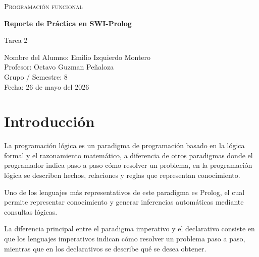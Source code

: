 \documentclass[12pt,a4paper]{article}
\begin{document}
\begin{titlepage}
    \centering


    {\scshape\Large Programación funcional \par}
    \vspace{1.5cm}

    {\huge\bfseries Reporte de Práctica en SWI-Prolog \par}
    \vspace{0.5cm}
    {\Large Tarea 2 \par}

    \vfill

    {\large
    Nombre del Alumno: Emilio Izquierdo Montero {\hspace{6cm}} \\
    \vspace{0.3cm}
    Profesor: Octavo Guzman Peñaloza {\hspace{6cm}} \\
    \vspace{0.3cm}
    Grupo / Semestre: 8 {\hspace{6cm}} \\
    \vspace{0.3cm}
    Fecha: 26 de mayo del 2026 {\hspace{6cm}}
    \par}

    \vfill

\end{titlepage}

\newpage

\section{Introducción}

La programación lógica es un paradigma de programación basado en la lógica formal y el razonamiento matemático, a diferencia de otros paradigmas donde el programador indica paso a paso cómo resolver un problema, en la programación lógica se describen hechos, relaciones y reglas que representan conocimiento.

Uno de los lenguajes más representativos de este paradigma es Prolog, el cual permite representar conocimiento y generar inferencias automáticas mediante consultas lógicas.

La diferencia principal entre el paradigma imperativo y el declarativo consiste en que los lenguajes imperativos indican cómo resolver un problema paso a paso, mientras que en los declarativos se describe qué se desea obtener.
\end{document}
